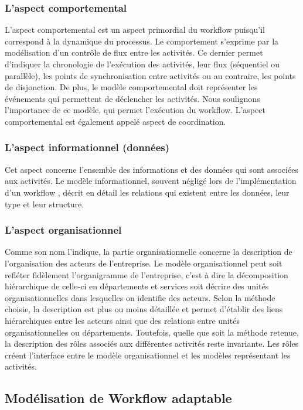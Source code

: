 \subsubsection{L'aspect comportemental}
L'aspect comportemental est un aspect primordial du workflow puisqu'il correspond à la dynamique du processus. Le comportement s'exprime par la modélisation d'un contrôle de flux entre les activités. Ce dernier permet d'indiquer la chronologie de l'exécution des activités, leur flux (séquentiel ou parallèle), les points de synchronisation entre activités ou au contraire, les points de disjonction. De plus, le modèle comportemental doit représenter les événements qui permettent de déclencher les activités. Nous soulignons l'importance de ce modèle, qui permet l'exécution du workflow. L'aspect comportemental est également appelé aspect de coordination.
\subsubsection{ L'aspect informationnel (données) }
Cet aspect concerne l'ensemble des informations et des données qui sont associées
aux activités. Le modèle informationnel, souvent négligé lors de l'implémentation d'un workflow \parencite{b3}, décrit en détail les relations qui existent entre les données, leur type et leur structure.
\subsubsection{L'aspect organisationnel }
Comme son nom l'indique, la partie organisationnelle concerne la description de l'organisation des acteurs de l'entreprise. Le modèle organisationnel peut soit refléter fidèlement l'organigramme de l'entreprise, c'est à dire la décomposition hiérarchique de celle-ci en départements et services soit décrire des unités organisationnelles dans lesquelles on identifie des acteurs. Selon la méthode choisie, la description est plus ou moins détaillée et permet d'établir des liens hiérarchiques entre les acteurs ainsi que des relations entre unités organisationnelles ou départements. Toutefois, quelle que soit la méthode retenue, la description des rôles associés aux différentes activités reste invariante. Les rôles créent l'interface entre le modèle organisationnel et les modèles représentant les activités.



\subsection{Modélisation de Workflow adaptable }

